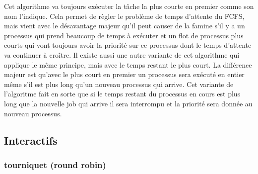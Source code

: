 \documentclass{article}
\begin{document}
Cet algorithme va toujours exécuter la tâche la plus courte en premier comme son nom l'indique. Cela permet de règler le problème de temps d'attente du FCFS, mais vient avec le désavantage majeur qu'il peut causer de la famine s'il y a un processus qui prend beaucoup de temps à exécuter et un flot de processus plus courts qui vont toujours avoir la priorité sur ce processus dont le temps d'attente va continuer à croître.
\newline
\newline
Il existe aussi une autre variante de cet algorithme qui applique le même principe, mais avec le temps restant le plus court. La différence majeur est qu'avec le plus court en premier un processus sera exécuté en entier même s'il est plus long qu'un nouveau processus qui arrive. Cet variante de l'algoritme fait en sorte que si le temps restant du processus en cours est plus long que la nouvelle job qui arrive il sera interrompu et la priorité sera donnée au nouveau processus.
\subsection{Interactifs}

\subsubsection{tourniquet (round robin)} 
\end{document}
